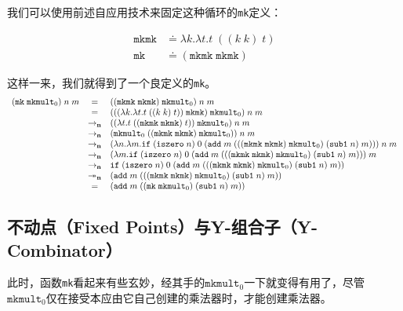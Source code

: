 \documentclass[12pt]{article}
\begin{document}
\indent{}我们可以使用前述自应用技术来固定这种循环的\texttt{mk}定义：
\begin{tcolorbox}[top=-1.5em,left=0mm,right=0mm,bottom=0mm]
\begin{align*}
\texttt{mkmk} &\doteq \lambda{}k.\lambda{}t.t\;((k\;k)\;t)\\
\texttt{mk}   &\doteq (\texttt{mkmk}\;\texttt{mkmk})
\end{align*}
\end{tcolorbox}
\noindent{}这样一来，我们就得到了一个良定义的\texttt{mk}。
\vspace{-0.5em}
\begin{gather*}
\begin{array}{lcl}
(\texttt{mk}\;\texttt{mkmult}_0)\;n\;m
& = & ((\texttt{mkmk}\;\texttt{mkmk})\;\texttt{mkmult}_0)\;n\;m\\
& = & (((\lambda{}k.\lambda{}t.t\;((k\;k)\;t))\;\texttt{mkmk})\;\texttt{mkmult}_0)\;n\;m\\
& \rightarrow_{\bf{n}} & ((\lambda{}t.t\;((\texttt{mkmk}\;\texttt{mkmk})\;t))\;\texttt{mkmult}_0)\;n\;m\\
& \rightarrow_{\bf{n}} & (\texttt{mkmult}_0\;((\texttt{mkmk}\;\texttt{mkmk})\;\texttt{mkmult}_0))\;n\;m\\
& \rightarrow_{\bf{n}} &
(\lambda{}n.\lambda{}m.\texttt{if}\;(\texttt{iszero}\;n)\;0\;(\texttt{add}\;m\;
(((\texttt{mkmk}\;\texttt{mkmk})\;\texttt{mkmult}_0)\;(\texttt{sub1}\;n)\;m)))\;n\;m\\
& \rightarrow_{\bf{n}} &
(\lambda{}m.\texttt{if}\;(\texttt{iszero}\;n)\;0\;(\texttt{add}\;m\;
(((\texttt{mkmk}\;\texttt{mkmk})\;\texttt{mkmult}_0)\;(\texttt{sub1}\;n)\;m)))\;m\\
& \rightarrow_{\bf{n}} &
\texttt{if}\;(\texttt{iszero}\;n)\;0\;(\texttt{add}\;m\;
(((\texttt{mkmk}\;\texttt{mkmk})\;\texttt{mkmult}_0)\;(\texttt{sub1}\;n)\;m))\\
& \twoheadrightarrow_{\bf{n}} &
(\texttt{add}\;m\;(((\texttt{mkmk}\;\texttt{mkmk})\;\texttt{mkmult}_0)\;(\texttt{sub1}\;n)\;m))\\
& = & (\texttt{add}\;m\;((\texttt{mk}\;\texttt{mkmult}_0)\;(\texttt{sub1}\;n)\;m))
\end{array}
\end{gather*}

\subsection{不动点（Fixed Points）与Y-组合子（Y-Combinator）}
\indent{}此时，函数\texttt{mk}看起来有些玄妙，经其手的$\texttt{mkmult}_0$一下就变得有用了，尽管
$\texttt{mkmult}_0$仅在接受本应由它自己创建的乘法器时，才能创建乘法器。
\end{document}
